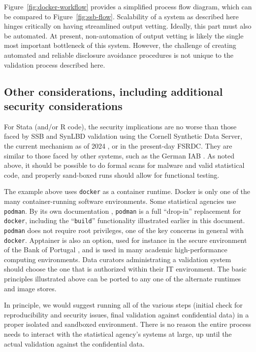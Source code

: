 \documentclass[inline]{hdsr}
\begin{document}
 Figure~\ref{fig:docker-workflow} provides a simplified process flow diagram, which can be compared to Figure~\ref{fig:ssb-flow}. Scalability of a system as described here hinges critically on having streamlined output vetting. Ideally, this  part must also be automated. At present, non-automation of output vetting is likely the single most important bottleneck of this system. However, the challenge of creating automated and reliable disclosure avoidance procedures is  not unique to the validation process described here.

\subsection{Other considerations, including additional security considerations}

For Stata (and/or R code), the security implications are no worse than those  faced by \ac{SSB} and SynLBD validation using the Cornell Synthetic Data Server, the current mechanism as of 2024 \citep{u.s.censusbureauSIPPSyntheticBeta2015b,us_census_bureau_validating_2023}, or in the present-day \ac{FSRDC}. They are similar to those faced by other systems, such as the German IAB \citep{bender_research-data-centre_2011,muller_institute_2021}. As noted above, it should be possible to do formal scans for malware and valid statistical code, and properly sand-boxed runs should allow for functional testing.

The example above uses \texttt{docker} as a container runtime. Docker is only one of the many container-running software environments. Some statistical agencies use \texttt{podman}. By its own documentation , \texttt{podman} is a full ``drop-in'' replacement for  \texttt{docker}, including the ``\texttt{build}'' functionality illustrated earlier in this document. \texttt{podman} does not require root privileges, one of the key concerns in general with \texttt{docker}. Apptainer \citep{noauthor_apptainer_nodate} is also an option, used for instance in the secure environment of the Bank of Portugal \citep{guimaraes_reproducibility_2023}, and is used in many academic high-performance computing environments. Data curators administrating a validation system should choose the one that is authorized within their IT environment. The basic principles illustrated above can be ported to any one of the alternate runtimes and image stores.

In principle, we would suggest running all of the various steps (initial check for reproducibility and security issues, final validation against confidential data) in a proper isolated and sandboxed environment. There is no reason the entire process needs to interact with the statistical agency's systems at large, up until the actual validation against the confidential data.
\end{document}
